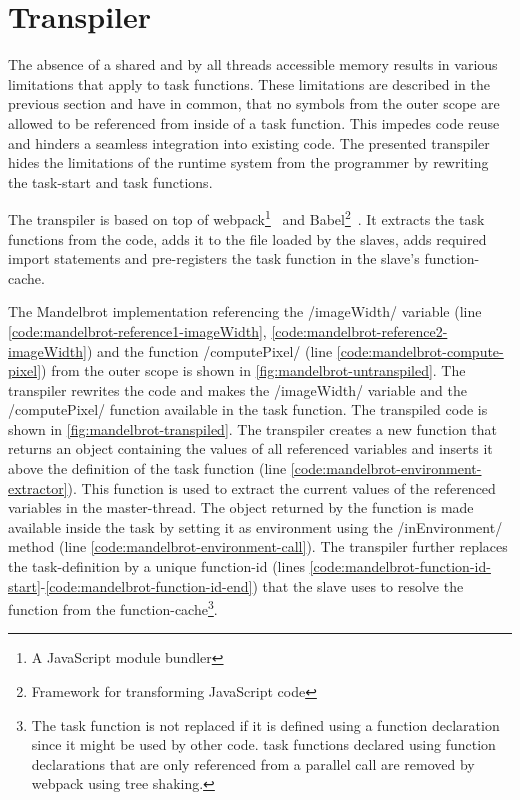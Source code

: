 \section{Transpiler}\label{sec:transpiler}
The absence of a shared and by all threads accessible memory results in various limitations that apply to task functions. These limitations are described in the previous section and have in common, that no symbols from the outer scope are allowed to be referenced from inside of a task function. This impedes code reuse and hinders a seamless integration into existing code. The presented transpiler hides the limitations of the runtime system from the programmer by rewriting the task-start and task functions.

The transpiler is based on top of webpack\footnote{A JavaScript module bundler}~\cite{webpack} and Babel\footnote{Framework for transforming JavaScript code}~\cite{babel}. It extracts the task functions from the code, adds it to the file loaded by the slaves, adds required import statements and pre-registers the task function in the slave's function-cache. 

The Mandelbrot implementation referencing the \javascriptinline/imageWidth/ variable (line \ref{code:mandelbrot-reference1-imageWidth}, \ref{code:mandelbrot-reference2-imageWidth}) and the function \javascriptinline/computePixel/ (line \ref{code:mandelbrot-compute-pixel}) from the outer scope is shown in \cref{fig:mandelbrot-untranspiled}. The transpiler rewrites the code and makes the \javascriptinline/imageWidth/ variable and the \javascriptinline/computePixel/ function available in the task function. The transpiled code is shown in \cref{fig:mandelbrot-transpiled}. The transpiler creates a new function that returns an object containing the values of all referenced variables and inserts it above the definition of the task function (line \ref{code:mandelbrot-environment-extractor}). This function is used to extract the current values of the referenced variables in the master-thread. The object returned by the function is made available inside the task by setting it as environment using the \javascriptinline/inEnvironment/ method (line \ref{code:mandelbrot-environment-call}). The transpiler further replaces the task-definition by a unique function-id (lines \ref{code:mandelbrot-function-id-start}-\ref{code:mandelbrot-function-id-end}) that the slave uses to resolve the function from the function-cache\footnote{The task function is not replaced if it is defined using a function declaration since it might be used by other code. task functions declared using function declarations that are only referenced from a parallel call are removed by webpack using tree shaking.}. 


